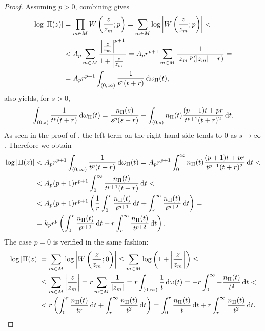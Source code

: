 \begin{proof}
    Assuming $p > 0$, combining  gives
    \begin{align*}
        \log \vert \Pi(z) \vert &= \prod_{m \in M} W \left( \frac{z}{z_m}; p \right) = \sum_{m \in M} \log \left\vert W \left( \frac{z}{z_m}; p \right) \right\vert < \\
        &< A_p \sum_{m \in M} \frac{\left\vert \frac{z}{z_m} \right\vert^{p+1}}{1 + \left\vert \frac{z}{z_m} \right\vert} = A_p r^{p+1} \sum_{m \in M} \frac{1}{\vert z_m \vert^p (\vert z_m \vert + r)} = \\
        &= A_p r^{p+1} \int_{(0, \infty)} \frac{1}{t^p (t+r)} \mathop{}\!\mathrm{d} \omega_\Pi(t),
    \end{align*}
     also yields, for $s > 0$,
    \begin{equation*}
        \int_{(0, s)} \frac{1}{t^p (t+r)} \mathop{}\!\mathrm{d} \omega_\Pi(t) = \frac{n_\Pi(s)}{s^p (s + r)} + \int_{(0, s)} n_\Pi(t) \frac{(p+1)t + pr}{t^{p+1} (t+r)^2} \mathop{}\!\mathrm{d} t.
    \end{equation*}
    As seen in the proof of , the left term on the right-hand side tends to $0$ as $s \to \infty$. Therefore we obtain
    \begin{align*}
        \log \vert \Pi(z) \vert &< A_p r^{p+1} \int_{(0, \infty)} \frac{1}{t^p (t+r)} \mathop{}\!\mathrm{d} \omega_\Pi(t) = A_p r^{p+1} \int_0^\infty n_\Pi(t) \frac{(p+1)t + pr}{t^{p+1} (t+r)^2} \mathop{}\!\mathrm{d} t < \\
        &< A_p (p+1) r^{p+1} \int_0^\infty \frac{n_\Pi(t)}{t^{p+1}(t+r)} \mathop{}\!\mathrm{d} t < \\
        &< A_p (p+1) r^{p+1} \left( \frac{1}{r} \int_0^r \frac{n_\Pi(t)}{t^{p+1}} \mathop{}\!\mathrm{d} t + \int_r^\infty \frac{n_\Pi(t)}{t^{p+2}} \mathop{}\!\mathrm{d} t \right) = \\
        &= k_p r^{p} \left( \int_0^r \frac{n_\Pi(t)}{t^{p+1}} \mathop{}\!\mathrm{d} t + r \int_r^\infty \frac{n_\Pi(t)}{t^{p+2}} \mathop{}\!\mathrm{d} t \right).
    \end{align*}
    The case $p=0$ is verified in the same fashion:
    \begin{align*}
        \log \vert \Pi(z) \vert &= \sum_{m \in M} \log \left\vert W \left( \frac{z}{z_m}; 0 \right) \right\vert \leq \sum_{m \in M} \log \left( 1 + \left\vert \frac{z}{z_m} \right\vert \right) \leq \\
        &\leq \sum_{m \in M} \left\vert \frac{z}{z_m} \right\vert = r \sum_{m \in M} \frac{1}{\vert z_m \vert} = r \int_{(0, \infty)} \frac{1}{t} \mathop{}\!\mathrm{d} \omega(t) = -r \int_0^\infty -\frac{n_\Pi(t)}{t^2} \mathop{}\!\mathrm{d} t < \\
        &< r \left( \int_0^r \frac{n_\Pi(t)}{tr} \mathop{}\!\mathrm{d} t + \int_r^\infty \frac{n_\Pi(t)}{t^2} \mathop{}\!\mathrm{d} t \right) = \int_0^r \frac{n_\Pi(t)}{t} \mathop{}\!\mathrm{d} t + r \int_r^\infty \frac{n_\Pi(t)}{t^2} \mathop{}\!\mathrm{d} t. \qedhere
    \end{align*}
\end{proof}

